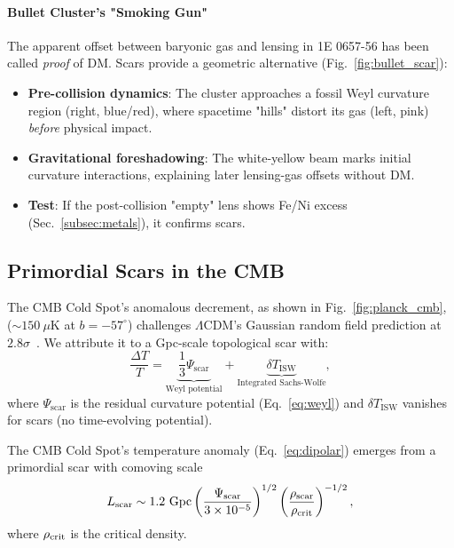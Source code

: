 \documentclass{article}
\begin{document}
\paragraph{Bullet Cluster's "Smoking Gun"}  
The apparent offset between baryonic gas and lensing in 1E 0657-56 \cite{Clowe2006} has been called \textit{proof} of DM. Scars provide a geometric alternative (Fig.~\ref{fig:bullet_scar}):  
\begin{itemize}  
    \item \textbf{Pre-collision dynamics}: The cluster approaches a fossil Weyl curvature region (right, blue/red), where spacetime "hills" distort its gas (left, pink) \textit{before} physical impact.  
    \item \textbf{Gravitational foreshadowing}: The white-yellow beam marks initial curvature interactions, explaining later lensing-gas offsets without DM.  
    \item \textbf{Test}: If the post-collision "empty" lens shows Fe/Ni excess (Sec.~\ref{subsec:metals}), it confirms scars.  
\end{itemize}  


\subsection{Primordial Scars in the CMB}
\label{subsec:cmb}

The CMB Cold Spot's anomalous decrement, as shown in Fig.~\ref{fig:planck_cmb}, ($\sim 150~\mu\mathrm{K}$ at $b = -57^\circ$) challenges $\Lambda$CDM's Gaussian random field prediction at $2.8\sigma$~\cite{Planck2023}. We attribute it to a Gpc-scale topological scar with:
\FloatBarrier
\begin{equation}
\frac{\Delta T}{T} = \underbrace{\frac{1}{3}\Psi_{\mathrm{scar}}}_{\text{Weyl potential}} + \underbrace{\delta T_\text{ISW}}_{\text{Integrated Sachs-Wolfe}},
\label{eq:cmb_decomposition}
\end{equation}
where $\Psi_{\mathrm{scar}}$ is the residual curvature potential (Eq.~\ref{eq:weyl}) and $\delta T_\text{ISW}$ vanishes for scars (no time-evolving potential).\\ \par

The CMB Cold Spot's temperature anomaly (Eq.~\ref{eq:dipolar}) emerges from a primordial scar with comoving scale
\begin{equation}
L_{\rm scar} \sim 1.2~{\rm Gpc} \left(\frac{\Psi_{\rm scar}}{3\times10^{-5}}\right)^{1/2} \left(\frac{\rho_{\rm scar}}{\rho_{\rm crit}}\right)^{-1/2},
\label{eq:scar_scale}
\end{equation} 
where $\rho_{\rm crit}$ is the critical density. \\ \par
\end{document}

